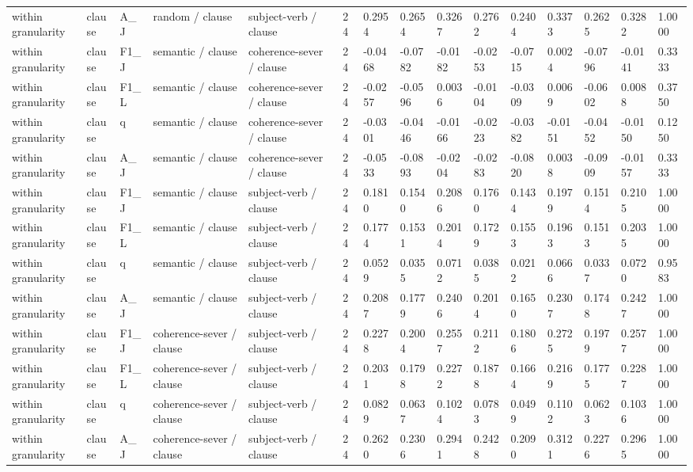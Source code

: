 \begin{table}[t]
{\begin{tabular}{lllllllllllllll}
within granularity & clause & A\_J & random / clause & subject-verb / clause & 24 & 0.2954 & 0.2654 & 0.3267 & 0.2762 & 0.2404 & 0.3373 & 0.2625 & 0.3282 & 1.0000 \\
within granularity & clause & F1\_J & semantic / clause & coherence-sever / clause & 24 & -0.0468 & -0.0782 & -0.0182 & -0.0253 & -0.0715 & 0.0024 & -0.0796 & -0.0141 & 0.3333 \\
within granularity & clause & F1\_L & semantic / clause & coherence-sever / clause & 24 & -0.0257 & -0.0596 & 0.0036 & -0.0104 & -0.0309 & 0.0069 & -0.0602 & 0.0088 & 0.3750 \\
within granularity & clause & q & semantic / clause & coherence-sever / clause & 24 & -0.0301 & -0.0446 & -0.0166 & -0.0223 & -0.0382 & -0.0151 & -0.0452 & -0.0150 & 0.1250 \\
within granularity & clause & A\_J & semantic / clause & coherence-sever / clause & 24 & -0.0533 & -0.0893 & -0.0204 & -0.0283 & -0.0820 & 0.0038 & -0.0909 & -0.0157 & 0.3333 \\
within granularity & clause & F1\_J & semantic / clause & subject-verb / clause & 24 & 0.1810 & 0.1540 & 0.2086 & 0.1760 & 0.1434 & 0.1979 & 0.1514 & 0.2105 & 1.0000 \\
within granularity & clause & F1\_L & semantic / clause & subject-verb / clause & 24 & 0.1774 & 0.1531 & 0.2014 & 0.1729 & 0.1553 & 0.1963 & 0.1513 & 0.2035 & 1.0000 \\
within granularity & clause & q & semantic / clause & subject-verb / clause & 24 & 0.0529 & 0.0355 & 0.0712 & 0.0385 & 0.0212 & 0.0666 & 0.0337 & 0.0720 & 0.9583 \\
within granularity & clause & A\_J & semantic / clause & subject-verb / clause & 24 & 0.2087 & 0.1779 & 0.2406 & 0.2014 & 0.1650 & 0.2307 & 0.1748 & 0.2427 & 1.0000 \\
within granularity & clause & F1\_J & coherence-sever / clause & subject-verb / clause & 24 & 0.2278 & 0.2004 & 0.2557 & 0.2112 & 0.1806 & 0.2725 & 0.1979 & 0.2577 & 1.0000 \\
within granularity & clause & F1\_L & coherence-sever / clause & subject-verb / clause & 24 & 0.2031 & 0.1798 & 0.2272 & 0.1878 & 0.1664 & 0.2169 & 0.1775 & 0.2287 & 1.0000 \\
within granularity & clause & q & coherence-sever / clause & subject-verb / clause & 24 & 0.0829 & 0.0637 & 0.1024 & 0.0783 & 0.0499 & 0.1102 & 0.0623 & 0.1036 & 1.0000 \\
within granularity & clause & A\_J & coherence-sever / clause & subject-verb / clause & 24 & 0.2620 & 0.2306 & 0.2941 & 0.2428 & 0.2090 & 0.3121 & 0.2276 & 0.2965 & 1.0000 \\

\end{tabular}}
\end{table}
